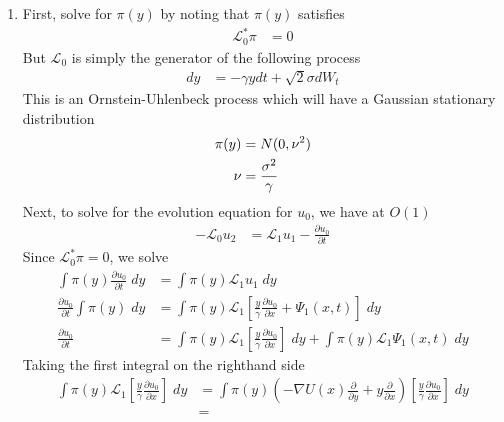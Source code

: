 \documentclass[12pt]{article}
\theoremstyle{plain}
\theoremstyle{definition}
\theoremstyle{remark}
\begin{document}
\begin{enumerate}
\begin{enumerate}
      \item %
        First, solve for $\pi(y)$ by noting that $\pi(y)$ satisfies
        \begin{align*}
          \mathscr{L}^*_0 \pi &= 0
        \end{align*}
        But $\mathscr{L}_0$ is simply the generator of the following
        process
        \begin{align*}
          dy &= -\gamma y dt + \sqrt{2} \sigma dW_t
        \end{align*}
        This is an Ornstein-Uhlenbeck process which will have a
        Gaussian stationary distribution
        \begin{align}
          \pi(y) &= N(0, \nu^2) \notag \\
          \nu &= \frac{\sigma^2}{\gamma}
          \label{q2e.1}
        \end{align}
        Next, to solve for the evolution equation for $u_0$, we have at
        $O(1)$
        \begin{align*}
          -\mathscr{L}_0u_2 &= \mathscr{L}_1u_1 -\frac{\partial u_0}{\partial t}
        \end{align*}
        Since $\mathscr{L}^*_0\pi=0$, we solve
        \begin{align*}
          \int \pi(y) \frac{\partial u_0}{\partial t} \; dy
          &= \int \pi(y) \mathscr{L}_1u_1 \; dy \\
          \frac{\partial u_0}{\partial t} \int \pi(y) \; dy
          &= \int \pi(y)
            \mathscr{L}_1
            \left[
            \frac{y}{\gamma} \frac{\partial u_0}{\partial x} + \Psi_1(x,t)
            \right] \; dy \\
          \frac{\partial u_0}{\partial t}
          &= \int \pi(y)
            \mathscr{L}_1
            \left[\frac{y}{\gamma} \frac{\partial u_0}{\partial x}\right] \; dy
            + \int \pi(y) \mathscr{L}_1\Psi_1(x,t) \; dy
        \end{align*}
        Taking the first integral on the righthand side
        \begin{align*}
            \int \pi(y)
            \mathscr{L}_1
            \left[\frac{y}{\gamma} \frac{\partial u_0}{\partial x}\right] \; dy
            &=
            \int \pi(y)
            \left(
            -\nabla U(x) \frac{\partial }{\partial y}
            + y \frac{\partial }{\partial x}
            \right)
            \left[\frac{y}{\gamma} \frac{\partial u_0}{\partial x}\right] \; dy\\
            &=

\end{align*}
\end{enumerate}
\end{enumerate}
\end{document}
